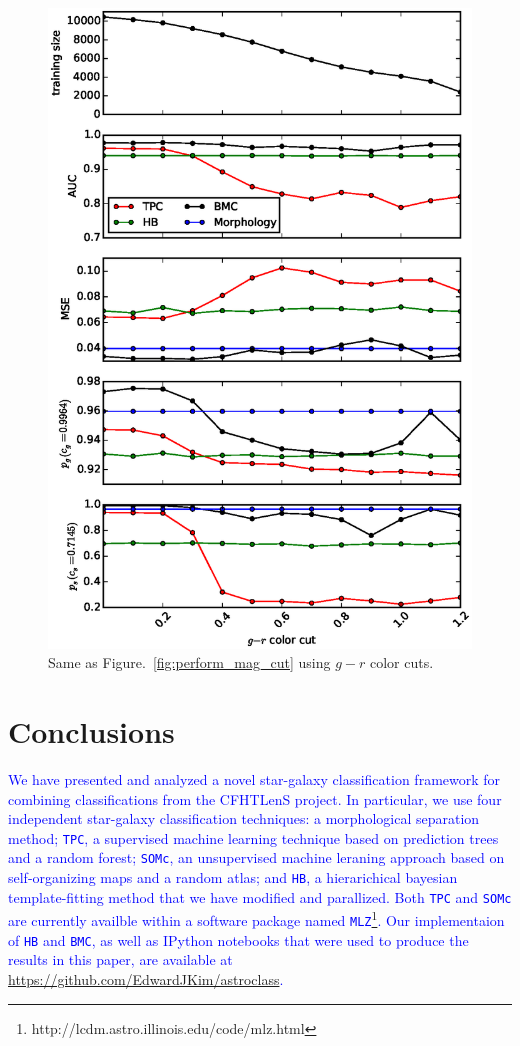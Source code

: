 \documentclass[useAMS,usenatbib]{mn2e}
\begin{document}
\begin{figure}
    \includegraphics[width=\linewidth]{figures/perform_g_r.eps}
    \caption{Same as Figure.~\ref{fig:perform_mag_cut} using
      $g - r$ color cuts.}
    \label{fig:perform_g_r_cut}
\end{figure}

\section{Conclusions}
  \label{section:conclusions}

\textcolor{blue}{We
have presented and analyzed a novel star-galaxy classification framework
for combining classifications from the CFHTLenS project.
In particular, we use four independent star-galaxy classification techniques:
a morphological separation method;
\texttt{TPC}, a supervised machine learning technique
based on prediction trees and a random forest;
\texttt{SOMc}, an unsupervised machine leraning approach
based on self-organizing maps and a random atlas;
and \texttt{HB}, a hierarichical bayesian template-fitting method
that we have modified and parallized.
Both \texttt{TPC} and \texttt{SOMc} are currently availble within
a software package named
\texttt{MLZ}\footnote{http://lcdm.astro.illinois.edu/code/mlz.html}.
Our implementaion of \texttt{HB} and \texttt{BMC},
as well as IPython notebooks that were used to
produce the results in this paper,
are available at \url{https://github.com/EdwardJKim/astroclass}.  }
\end{document}

